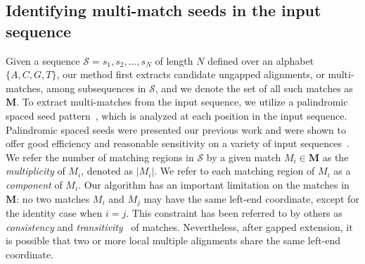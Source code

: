 \documentclass[12pt,journal,draftcls,letterpaper,onecolumn]{IEEEtran}
\begin{document}
\subsection{Identifying multi-match seeds in the input sequence}
Given a sequence $\mathcal{S}=s_1, s_2,\dots, s_N$ of length $N$
defined over an alphabet $\{A,C,G,T\}$, our method first extracts candidate ungapped
alignments, or multi-matches, among subsequences in $\mathcal{S}$,
and we denote the set of all such matches as $\mathbf{M}$. To extract multi-matches from the input
sequence, we utilize a palindromic spaced seed pattern~\cite{ref-zhang}, which is
analyzed at each position in the input sequence.
Palindromic spaced seeds were presented our previous work and were shown to offer good efficiency and
reasonable sensitivity on a variety of input
sequences~\cite{ref-procrast}.  We refer the number of matching regions
in $\mathcal{S}$ by a given match $M_i \in \mathbf{M}$ as the
\textit{multiplicity} of $M_i$, denoted as $|M_i|$. We refer to each
matching region of $M_i$ as a \textit{component} of $M_i$. Our
algorithm has an important limitation on the matches in $\mathbf{M}$:
no two matches $M_i$ and $M_j$ may have the same left-end coordinate,
except for the identity case when $i=j$.  This constraint has been
referred to by others as \textit{consistency} and
\textit{transitivity}~\cite{ref-transitivity} of matches. Nevertheless,
after gapped extension, it is possible that two or more
local multiple alignments share the same left-end coordinate.
\end{document}
